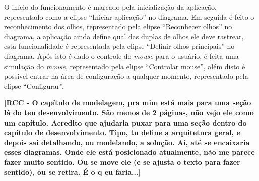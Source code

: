 O início do funcionamento é marcado pela inicialização da aplicação, representado como a elipse “Iniciar aplicação” no diagrama. Em seguida é feito o reconhecimento dos olhos, representado pela elipse “Reconhecer olhos” no diagrama, a aplicação ainda define qual das duplas de olhos ele deve rastrear, esta funcionalidade é representada pela elipse “Definir olhos principais” no diagrama.  Após isto é dado o controle do \textit{mouse} para o usuário, é feita uma simulação do \textit{mouse}, representado pela elipse “Controlar mouse”, além disto é possível entrar na área de configuração a qualquer momento, representado pela elipse “Configurar”.

\textbf{[RCC - O capítulo de modelagem, pra mim está mais para uma seção lá do teu desenvolvimento. São menos de 2 páginas, não vejo ele como um capítulo. Acredito que ajudaria puxar para uma seção dentro do capítulo de desenvolvimento. Tipo, tu define a arquitetura geral, e depois sai detalhando, ou modelando, a solução. Aí, até se encaixaria esses diagramas. Onde ele está posicionado atualmente, não me parece fazer muito sentido. Ou se move ele (e se ajusta o texto para fazer sentido), ou se retira. É o q eu faria...}]




